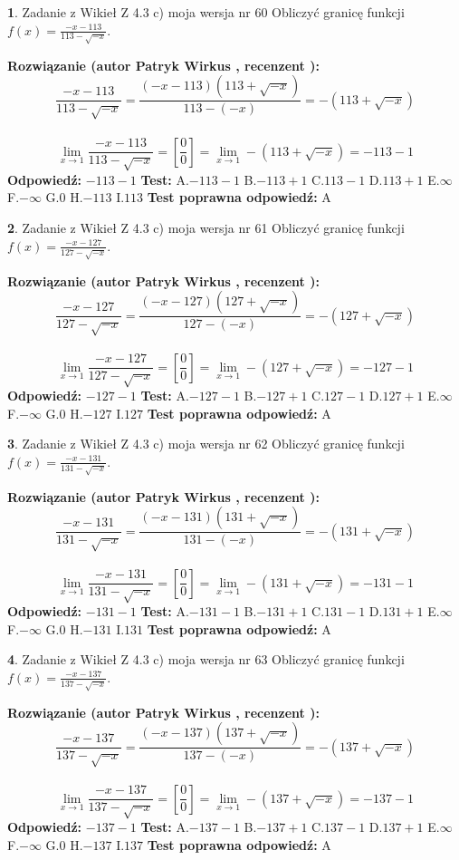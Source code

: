\documentclass[12pt, a4paper]{article}
\theoremstyle{definition} %
\newtheorem{zad}{}
\newcommand{\zadStart}[1]{\begin{zad}#1\newline}
\newcommand{\zadStop}{\end{zad}}
\newcommand{\rozwStart}[2]{\noindent \textbf{Rozwiązanie (autor #1 , recenzent #2): }\newline}
\newcommand{\rozwStop}{\newline}
\newcommand{\odpStart}{\noindent \textbf{Odpowiedź:}\newline}
\newcommand{\odpStop}{\newline}
\newcommand{\testStart}{\noindent \textbf{Test:}\newline}
\newcommand{\testStop}{\newline}
\newcommand{\kluczStart}{\noindent \textbf{Test poprawna odpowiedź:}\newline}
\newcommand{\kluczStop}{\newline}
\begin{document}
\zadStart{Zadanie z Wikieł Z 4.3 c) moja wersja nr 60}
Obliczyć granicę funkcji $f(x)=\frac{-x-113}{113-\sqrt{-x}}$.
\zadStop
\rozwStart{Patryk Wirkus}{}
$$\frac{-x-113}{113-\sqrt{-x}}=\frac{(-x-113)(113+\sqrt{-x})}{113-(-x)}=-(113+\sqrt{-x})$$
\\
$$\lim\limits_{x\to1}\frac{-x-113}{113-\sqrt{-x}}=[\frac{0}{0}]=\lim\limits_{x\to1}-(113+\sqrt{-x}) =-113-1$$
\rozwStop
\odpStart
$-113-1$
\odpStop
\testStart
A.$-113-1$
B.$-113+1$
C.$113-1$
D.$113+1$
E.$\infty$
F.$-\infty$
G.$0$
H.$-113$
I.$113$
\testStop
\kluczStart
A
\kluczStop



\zadStart{Zadanie z Wikieł Z 4.3 c) moja wersja nr 61}
Obliczyć granicę funkcji $f(x)=\frac{-x-127}{127-\sqrt{-x}}$.
\zadStop
\rozwStart{Patryk Wirkus}{}
$$\frac{-x-127}{127-\sqrt{-x}}=\frac{(-x-127)(127+\sqrt{-x})}{127-(-x)}=-(127+\sqrt{-x})$$
\\
$$\lim\limits_{x\to1}\frac{-x-127}{127-\sqrt{-x}}=[\frac{0}{0}]=\lim\limits_{x\to1}-(127+\sqrt{-x}) =-127-1$$
\rozwStop
\odpStart
$-127-1$
\odpStop
\testStart
A.$-127-1$
B.$-127+1$
C.$127-1$
D.$127+1$
E.$\infty$
F.$-\infty$
G.$0$
H.$-127$
I.$127$
\testStop
\kluczStart
A
\kluczStop



\zadStart{Zadanie z Wikieł Z 4.3 c) moja wersja nr 62}
Obliczyć granicę funkcji $f(x)=\frac{-x-131}{131-\sqrt{-x}}$.
\zadStop
\rozwStart{Patryk Wirkus}{}
$$\frac{-x-131}{131-\sqrt{-x}}=\frac{(-x-131)(131+\sqrt{-x})}{131-(-x)}=-(131+\sqrt{-x})$$
\\
$$\lim\limits_{x\to1}\frac{-x-131}{131-\sqrt{-x}}=[\frac{0}{0}]=\lim\limits_{x\to1}-(131+\sqrt{-x}) =-131-1$$
\rozwStop
\odpStart
$-131-1$
\odpStop
\testStart
A.$-131-1$
B.$-131+1$
C.$131-1$
D.$131+1$
E.$\infty$
F.$-\infty$
G.$0$
H.$-131$
I.$131$
\testStop
\kluczStart
A
\kluczStop



\zadStart{Zadanie z Wikieł Z 4.3 c) moja wersja nr 63}
Obliczyć granicę funkcji $f(x)=\frac{-x-137}{137-\sqrt{-x}}$.
\zadStop
\rozwStart{Patryk Wirkus}{}
$$\frac{-x-137}{137-\sqrt{-x}}=\frac{(-x-137)(137+\sqrt{-x})}{137-(-x)}=-(137+\sqrt{-x})$$
\\
$$\lim\limits_{x\to1}\frac{-x-137}{137-\sqrt{-x}}=[\frac{0}{0}]=\lim\limits_{x\to1}-(137+\sqrt{-x}) =-137-1$$
\rozwStop
\odpStart
$-137-1$
\odpStop
\testStart
A.$-137-1$
B.$-137+1$
C.$137-1$
D.$137+1$
E.$\infty$
F.$-\infty$
G.$0$
H.$-137$
I.$137$
\testStop
\kluczStart
A
\kluczStop
\end{document}
